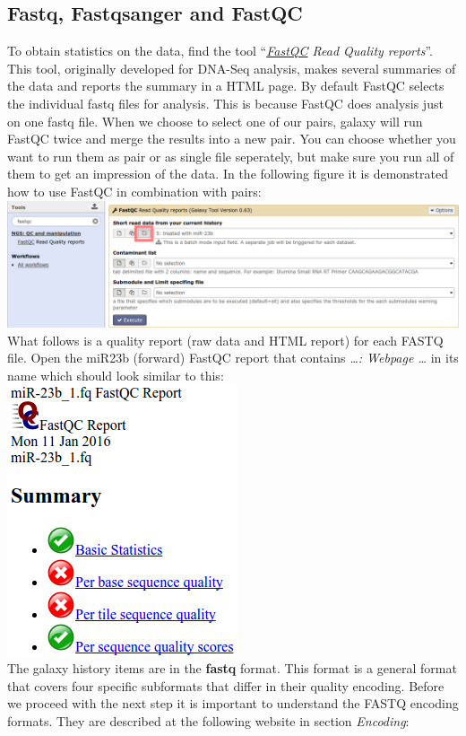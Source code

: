 \subsection{Fastq, Fastqsanger and FastQC}
To obtain statistics on the data, find the tool ``\textit{\underline{FastQC} Read Quality reports}''. This tool, originally developed for DNA-Seq analysis, makes several summaries of the data and reports the summary in a HTML page. By default FastQC selects the individual fastq files for analysis. This is because FastQC does analysis just on one fastq file. When we choose to select one of our pairs, galaxy will run FastQC twice and merge the results into a new pair. You can choose whether you want to run them as pair or as single file seperately, but make sure you run all of them to get an impression of the data. In the following figure it is demonstrated how to use FastQC in combination with pairs:\\
\includegraphics[width=\textwidth]{figures/qc_03.png}\\
What follows is a quality report (raw data and HTML report) for each FASTQ file. Open the miR23b (forward) FastQC report that contains \textit{\ldots: Webpage \ldots} in its name which should look similar to this:\\
\includegraphics[scale=0.65]{figures/qc_04.png}\\
The galaxy history items are in the \textbf{fastq} format. This format is a general format that covers four specific subformats that differ in their quality encoding. Before we proceed with the next step it is important to understand the FASTQ encoding formats. They are described at the following website in section \textit{Encoding}:\\
